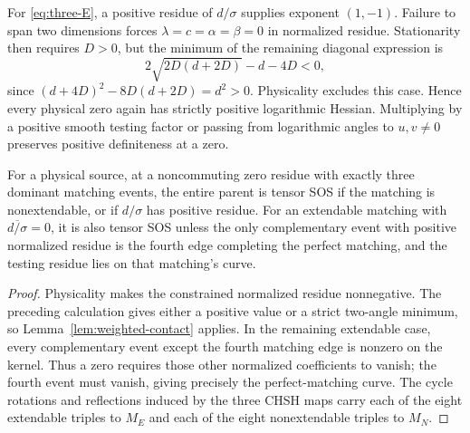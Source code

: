 For \eqref{eq:three-E}, a positive residue of $d/\sigma$ supplies exponent $(1,-1)$. Failure to span two dimensions forces $\lambda=c=\alpha=\beta=0$ in normalized residue. Stationarity then requires $D>0$, but the minimum of the remaining diagonal expression is
\[
2\sqrt{2D(d+2D)}-d-4D<0,
\]
since $(d+4D)^2-8D(d+2D)=d^2>0$. Physicality excludes this case. Hence every physical zero again has strictly positive logarithmic Hessian. Multiplying by a positive smooth testing factor or passing from logarithmic angles to $u,v\ne0$ preserves positive definiteness at a zero.

\begin{theorem}\label{thm:three-event-weighted}
For a physical source, at a noncommuting zero residue with exactly three dominant matching events, the entire parent is tensor SOS if the matching is nonextendable, or if $d/\sigma$ has positive residue. For an extendable matching with $\overline{d/\sigma}=0$, it is also tensor SOS unless the only complementary event with positive normalized residue is the fourth edge completing the perfect matching, and the testing residue lies on that matching's curve.
\end{theorem}
\begin{proof}
Physicality makes the constrained normalized residue nonnegative. The preceding calculation gives either a positive value or a strict two-angle minimum, so Lemma~\ref{lem:weighted-contact} applies. In the remaining extendable case, every complementary event except the fourth matching edge is nonzero on the kernel. Thus a zero requires those other normalized coefficients to vanish; the fourth event must vanish, giving precisely the perfect-matching curve. The cycle rotations and reflections induced by the three CHSH maps carry each of the eight extendable triples to $M_E$ and each of the eight nonextendable triples to $M_N$.
\end{proof}

